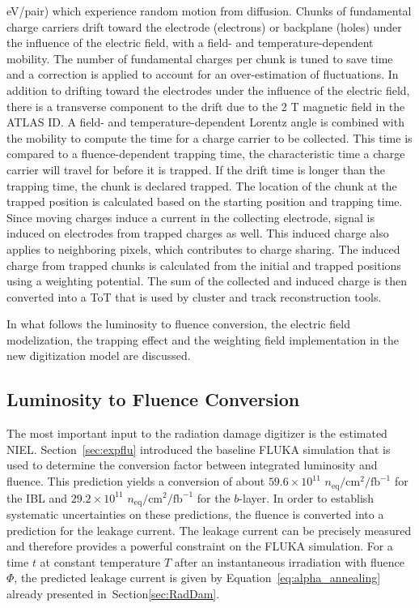 eV/pair) which experience random motion from diffusion.  Chunks of fundamental charge carriers drift 
toward the electrode (electrons) or backplane (holes) under the influence of the electric field, with a 
field- and temperature-dependent mobility.  The number of fundamental charges per chunk is tuned to 
save time and a correction is applied to account for an over-estimation of fluctuations.  In addition to drifting toward the electrodes under the influence of the electric 
field, there is a transverse component to the drift due to the 2 T magnetic field in the ATLAS ID.  A field- 
and temperature-dependent Lorentz angle is combined with the mobility to compute the time for a 
charge carrier to be collected.  This time is compared to a 
fluence-dependent trapping time, the characteristic time a charge 
carrier will travel for before it is trapped.  If the drift time is longer than the trapping time, the chunk is 
declared trapped.  The location of the chunk at the trapped position is calculated based on the starting 
position and trapping time.  Since moving charges induce a current in the 
collecting electrode, signal is induced on electrodes from trapped charges as well.  This induced charge 
also applies to neighboring pixels, which contributes to charge sharing.  The induced charge from 
trapped chunks is calculated from the initial and trapped positions using a weighting potential.  The sum of the collected and induced charge is then converted into a ToT that is 
used by cluster and track reconstruction tools.

In what follows the luminosity to fluence conversion, the electric field modelization, the trapping effect 
and the weighting field implementation in the new digitization model are discussed.


\subsection{Luminosity to Fluence Conversion}
 The most important input to the radiation damage digitizer is the estimated NIEL.  
 Section~\ref{sec:expflu} introduced the baseline FLUKA simulation that is used to determine the 
 conversion factor between integrated luminosity and fluence. This prediction yields a conversion of
  about $59.6\times 10^{11}$ $n_\text{eq}/\text{cm}^2/\text{fb}^{-1}$ for the IBL and $29.2\times 10^{11}$ $n_\text{eq}/\text{cm}^2/\text{fb}^{-1}$ for the $b$-layer. In order to establish systematic uncertainties on these predictions, the fluence is converted into a prediction for the leakage current. The leakage 
current can be precisely measured and therefore provides a powerful constraint on the FLUKA simulation. For a time $t$ at constant temperature $T$ after an instantaneous irradiation with fluence $\Phi$, the predicted leakage current is given by Equation~\ref{eq:alpha_annealing} already presented 
in~Section\ref{sec:RadDam}.

